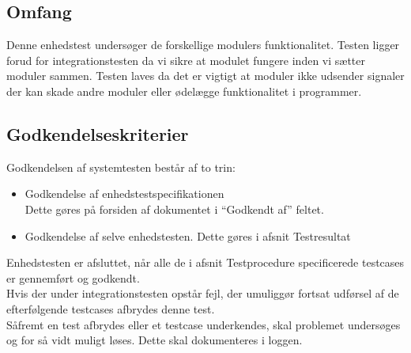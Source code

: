 \subsection{Omfang}
Denne enhedstest undersøger de forskellige modulers funktionalitet. Testen ligger forud for integrationstesten da vi sikre at modulet fungere inden vi sætter moduler sammen. Testen laves da det er vigtigt at moduler ikke udsender signaler der kan skade andre moduler eller ødelægge funktionalitet i programmer. 
\subsection{Godkendelseskriterier}
Godkendelsen af systemtesten består af to trin:\\
\begin{itemize}
\item Godkendelse af enhedstestspecifikationen\\
Dette gøres på forsiden af dokumentet i “Godkendt af” feltet.
\item Godkendelse af selve enhedstesten. Dette gøres i afsnit Testresultat
\end{itemize}
Enhedstesten er afsluttet, når alle de i afsnit Testprocedure specificerede testcases er gennemført og godkendt.\\
Hvis der under integrationstesten opstår fejl, der umuliggør fortsat udførsel af de efterfølgende testcases afbrydes denne test.\\
Såfremt en test afbrydes eller et testcase underkendes, skal problemet undersøges og for så vidt muligt løses. Dette skal dokumenteres i loggen.\\